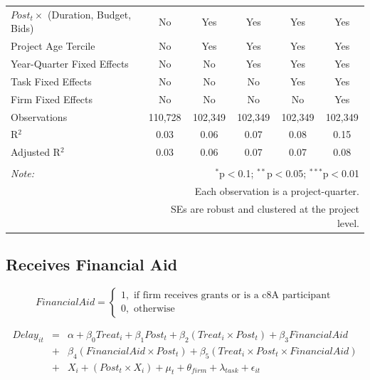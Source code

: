 \documentclass[
]{article}
\begin{document}
\begin{table}[H]
\begin{tabular}{@{\extracolsep{-2pt}}lccccc}
$Post_t \times $  (Duration, Budget, Bids) & No & Yes & Yes & Yes & Yes \\ 
Project Age Tercile & No & Yes & Yes & Yes & Yes \\ 
Year-Quarter Fixed Effects & No & No & Yes & Yes & Yes \\ 
Task Fixed Effects & No & No & No & Yes & Yes \\ 
Firm Fixed Effects & No & No & No & No & Yes \\ 
Observations & 110,728 & 102,349 & 102,349 & 102,349 & 102,349 \\ 
R$^{2}$ & 0.03 & 0.06 & 0.07 & 0.08 & 0.15 \\ 
Adjusted R$^{2}$ & 0.03 & 0.06 & 0.07 & 0.07 & 0.08 \\ 
\hline 
\hline \\[-1.8ex] 
\textit{Note:}  & \multicolumn{5}{r}{$^{*}$p$<$0.1; $^{**}$p$<$0.05; $^{***}$p$<$0.01} \\ 
 & \multicolumn{5}{r}{Each observation is a project-quarter.} \\ 
 & \multicolumn{5}{r}{SEs are robust and clustered at the project level.} \\ 
\end{tabular} 
\end{table}

\hypertarget{receives-financial-aid}{%
\subsection{Receives Financial Aid}\label{receives-financial-aid}}

\[ FinancialAid = \begin{cases} 1, \text{ if firm receives grants or is a c8A participant}\\
0, \text{ otherwise} \end{cases}\]

\[ \begin{aligned}
Delay_{it} &=& \alpha+\beta_0 Treat_i + \beta_1 Post_t + \beta_2 (Treat_i \times Post_t) +\beta_3 FinancialAid \\
&+& \beta_4 (FinancialAid \times Post_t) + \beta_5 (Treat_i \times Post_t \times FinancialAid) \\ 
&+&X_i + (Post_t \times X_i) + \mu_t + \theta_{firm} + \lambda_{task}+ \epsilon_{it}
\end{aligned}\]
\end{document}
